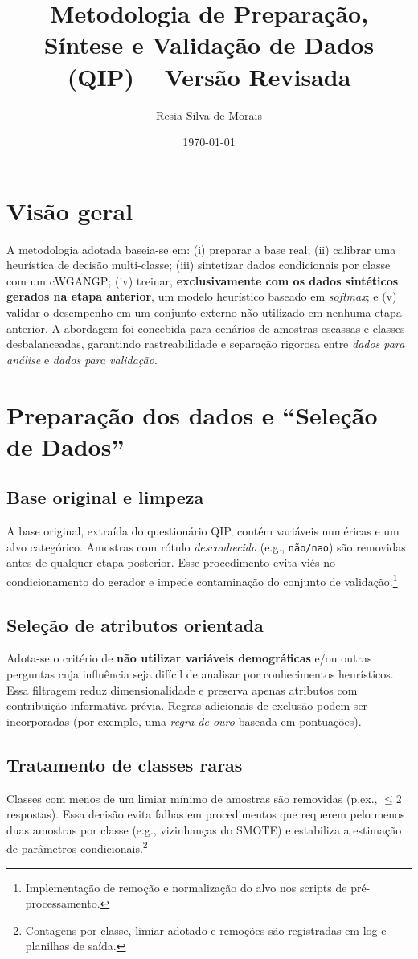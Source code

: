\documentclass[12pt,a4paper]{article}
\title{\textbf{Metodologia de Preparação, Síntese e Validação de Dados (QIP) -- Versão Revisada}}
\author{Resia Silva de Morais}
\date{\today}
\begin{document}
\maketitle

\section{Visão geral}
A metodologia adotada baseia-se em: (i) preparar a base real; (ii) calibrar uma heurística de decisão multi-classe; (iii) sintetizar dados condicionais por classe com um cWGAN\textendash GP; (iv) treinar, \textbf{exclusivamente com os dados sintéticos gerados na etapa anterior}, um modelo heurístico baseado em \emph{softmax}; e (v) validar o desempenho em um conjunto externo não utilizado em nenhuma etapa anterior. A abordagem foi concebida para cenários de amostras escassas e classes desbalanceadas, garantindo rastreabilidade e separação rigorosa entre \emph{dados para análise} e \emph{dados para validação}.

\section{Preparação dos dados e ``Seleção de Dados''}
\subsection{Base original e limpeza}
A base original, extraída do questionário QIP, contém variáveis numéricas e um alvo categórico. Amostras com rótulo \emph{desconhecido} (e.g., \texttt{não/nao}) são removidas antes de qualquer etapa posterior. Esse procedimento evita viés no condicionamento do gerador e impede contaminação do conjunto de validação.\footnote{Implementação de remoção e normalização do alvo nos scripts de pré-processamento.}

\subsection{Seleção de atributos orientada}
Adota-se o critério de \textbf{não utilizar variáveis demográficas} e/ou outras perguntas cuja influência seja difícil de analisar por conhecimentos heurísticos. Essa filtragem reduz dimensionalidade e preserva apenas atributos com contribuição informativa prévia. Regras adicionais de exclusão podem ser incorporadas (por exemplo, uma \emph{regra de ouro} baseada em pontuações).

\subsection{Tratamento de classes raras}
Classes com menos de um limiar mínimo de amostras são removidas (p.ex., $\leq 2$ respostas). Essa decisão evita falhas em procedimentos que requerem pelo menos duas amostras por classe (e.g., vizinhanças do SMOTE) e estabiliza a estimação de parâmetros condicionais.\footnote{Contagens por classe, limiar adotado e remoções são registradas em log e planilhas de saída.}
\end{document}
